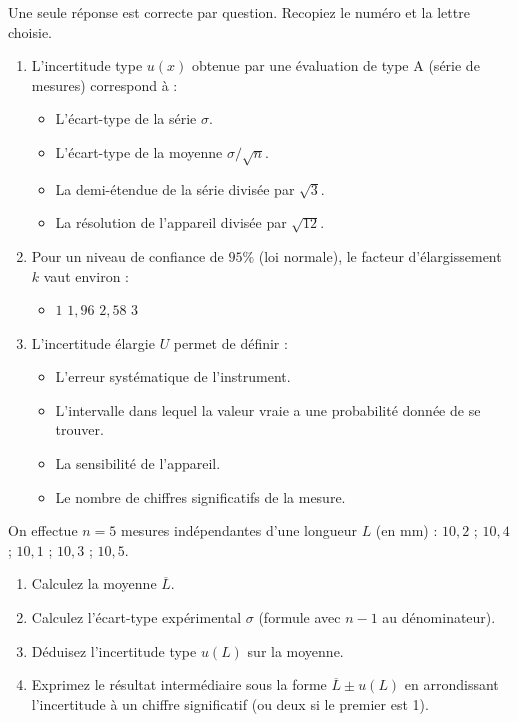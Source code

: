 \documentclass[11pt]{article}
\begin{document}
\begin{exercice}
Une seule réponse est correcte par question. Recopiez le numéro et la lettre choisie.
\begin{enumerate}
\item L'incertitude type $u(x)$ obtenue par une évaluation de type A (série de mesures) correspond à :
\begin{itemize}
\item[A.] L'écart-type de la série $\sigma$.
\item[B.] L'écart-type de la moyenne $\sigma/\sqrt{n}$.
\item[C.] La demi-étendue de la série divisée par $\sqrt{3}$.
\item[D.] La résolution de l'appareil divisée par $\sqrt{12}$.
\end{itemize}
\item Pour un niveau de confiance de $95\%$ (loi normale), le facteur d'élargissement $k$ vaut environ :
\begin{itemize}
\item[A.] $1$ \quad [B.] $1,96$ \quad [C.] $2,58$ \quad [D.] $3$
\end{itemize}
\item L'incertitude élargie $U$ permet de définir :
\begin{itemize}
\item[A.] L'erreur systématique de l'instrument.
\item[B.] L'intervalle dans lequel la valeur vraie a une probabilité donnée de se trouver.
\item[C.] La sensibilité de l'appareil.
\item[D.] Le nombre de chiffres significatifs de la mesure.
\end{itemize}
\end{enumerate}
\end{exercice}

\begin{exercice}
On effectue $n = 5$ mesures indépendantes d'une longueur $L$ (en mm) : 
$10,2$ ; $10,4$ ; $10,1$ ; $10,3$ ; $10,5$.
\begin{enumerate}
\item Calculez la moyenne $\overline{L}$.
\item Calculez l'écart-type expérimental $\sigma$ (formule avec $n-1$ au dénominateur).
\item Déduisez l'incertitude type $u(L)$ sur la moyenne.
\item Exprimez le résultat intermédiaire sous la forme $\overline{L} \pm u(L)$ en arrondissant l'incertitude à un chiffre significatif (ou deux si le premier est 1).
\end{enumerate}
\end{exercice}
\end{document}
